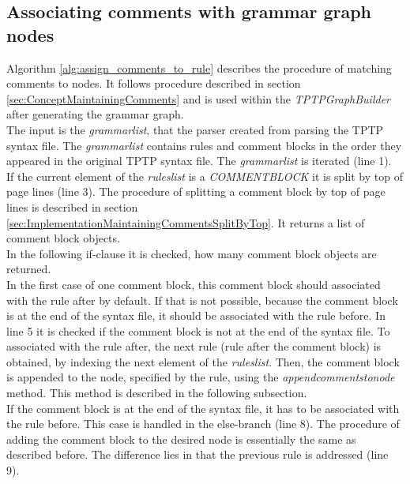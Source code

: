 \subsection{Associating comments with grammar graph nodes}\label{sec:ImplementationMaintainingCommentsAssociateWithNodes}

Algorithm \ref{alg:assign_comments_to_rule} describes the procedure of matching comments to nodes. It follows procedure described in section \ref{sec:ConceptMaintainingComments} and is used within the \textit{TPTPGraphBuilder} after generating the grammar graph.\\
The input is the \textit{grammar\textunderscore list}, that the parser created from parsing the \ac{TPTP} syntax file.
The \textit{grammar\textunderscore list} contains rules and comment blocks in the order they appeared in the original \ac{TPTP} syntax file.
The \textit{grammar\textunderscore list} is iterated (line 1).\\
If the current element of the \textit{rules\textunderscore list} is a \textit{COMMENT\textunderscore BLOCK} it is split by top of page lines (line 3).
The procedure of splitting a comment block by top of page lines is described in section \ref{sec:ImplementationMaintainingCommentsSplitByTop}.
It returns a list of comment block objects.\\
In the following if-clause it is checked, how many comment block objects are returned.\\
In the first case of one comment block, this comment block should associated with the rule after by default. If that is not possible, because the comment block is at the end of the syntax file, it should be associated with the rule before.
In line 5 it is checked if the comment block is not at the end of the syntax file. To associated with the rule after, the next rule (rule after the comment block) is obtained, by indexing the next element of the \textit{rules\textunderscore list}.
Then, the comment block is appended to the node, specified by the rule, using the \textit{append\textunderscore comments\textunderscore to\textunderscore node} method. This method is described in the following subsection.\\
If the comment block is at the end of the syntax file, it has to be associated with the rule before.
This case is handled in the else-branch (line 8).
The procedure of adding the comment block to the desired node is essentially the same as described before. The difference lies in that the previous rule is addressed (line 9).\\
